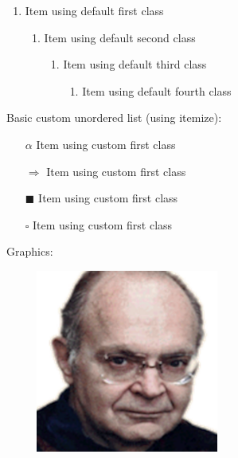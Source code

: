 \documentclass[11pt, english]{article}
\begin{document}
	\begin{enumerate}
	\setlength\itemsep{0cm}
                \item Item using default first class
                \begin{enumerate}        
                        \item Item using default second class
                        \begin{enumerate}
                                \item Item using default third class
                                \begin{enumerate}
                                        \item Item using default fourth class
                                \end{enumerate}   
                        \end{enumerate}
                \end{enumerate}
        \end{enumerate}

	Basic custom unordered list (using itemize):

	\begin{itemize}
	\setlength\itemsep{0cm}
		\item[$\alpha$] Item using custom first class
		\item[$\Longrightarrow$] Item using custom first class
		\item[$\blacksquare$] Item using custom first class
		\item[$\square$] Item using custom first class
        \end{itemize}

	\newpage

	Graphics:

	\begin{center}
                \includegraphics[width=8cm,height=6cm]{../Blog/Photos_FF/knuth.png}
        \end{center}
\end{document}
